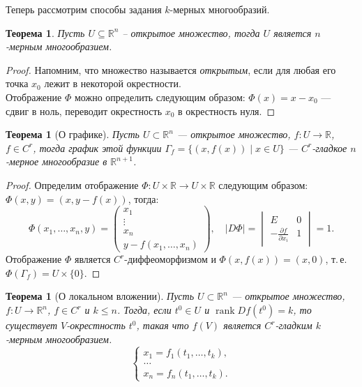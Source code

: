 \documentclass[a5paper]{article}
\newcounter{through}
\theoremstyle{plain}
\newtheorem{theorem}[through]{Теорема}
\theoremstyle{definition}
\numberwithin{through}{section}
\numberwithin{equation}{section}
\DeclareMathOperator{\rank}{rank}
\begin{document}
Теперь рассмотрим способы задания $k$-мерных многообразий.

\begin{theorem}%
	\label{OpenSetManifold}
	Пусть $U \subseteq \mathbb{R}^n$ -- открытое множество, тогда $U$ является
	$n$-мерным многообразием.
\end{theorem} 
\begin{proof}
	Напомним, что множество называется \textit{открытым}, если для любая его точка $x_0$ лежит в некоторой окрестности.\\
	Отображение $\Phi$ можно определить следующим образом:
	$\Phi(x)=x-x_0$ --- сдвиг в ноль, переводит окрестность $x_0$ в окрестность нуля.
\end{proof}

\begin{theorem}[О графике]
	Пусть $U \subset \mathbb{R}^n$ --- открытое множество, $f: U \to \mathbb{R}$, $f \in C^r$, тогда график этой функции $\Gamma_f =
	\{ (x, f(x))  \mid x \in U \}$ --- $C^r$-гладкое $n$-мерное многообразие в $\mathbb{R}^{n+1}$.
\end{theorem}

\begin{proof}
	Определим отображение $\Phi : U \times \mathbb{R} \to U \times \mathbb{R}$ следующим образом: $\Phi(x, y) = (x, y - f(x))$, тогда:
\[
\Phi(x_1, \ldots, x_n, y) =
	\begin{pmatrix}
	x_1 \\
	\vdots \\
	x_n \\
	y - f(x_1, \ldots, x_n)
	\end{pmatrix},
	\quad
	\left| D \Phi \right|=
	\begin{vmatrix}
	E& 0 \\
	-\frac{\partial f}{\partial x_i} & 1
	\end{vmatrix}
	= 1.
\]
	Отображение $\Phi$ является $C^r$-диффеоморфизмом и $\Phi(x,f(x)) = (x, 0)$, т.\,е. $\Phi(\Gamma_f) = U \times \{0\}$.
\end{proof}

\begin{theorem}[О локальном вложении]

	Пусть $U \subset \mathbb{R}^n$ --- открытое множество, $f: U \to \mathbb{R}^n$, $f \in C^r$ и $k \leq n $. Тогда, если $t^0 \in U$ и $\rank Df(t^0) = k$, то существует $V$-окрестность $t^0$, такая что $f(V)$ является $C^r$-гладким $k$-мерным многообразием.
		\begin{equation*}
	\begin{cases}
	x_1 = f_1(t_1,\ldots,t_k), \\
	\ldots \\
	x_n = f_n(t_1,\ldots, t_k).
	\end{cases}
	\end{equation*}
\end{theorem}
\end{document}
